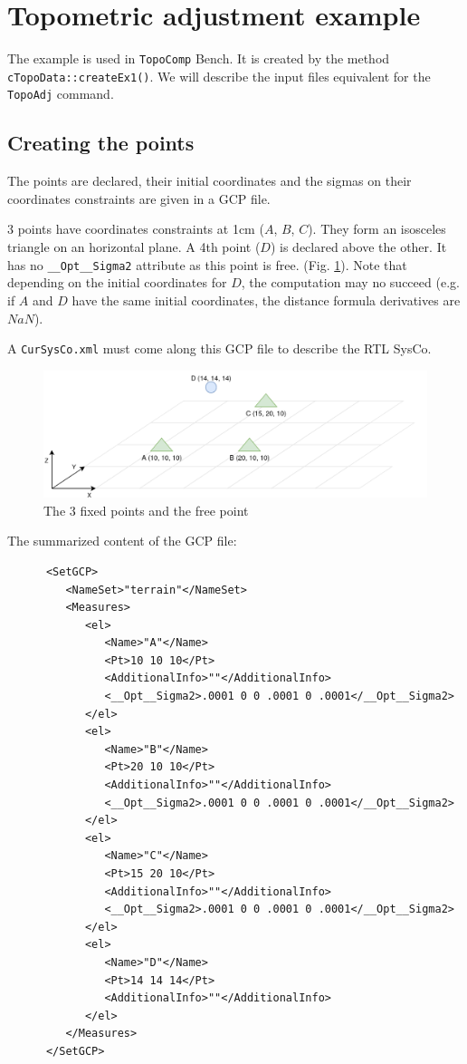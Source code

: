 \section{Topometric adjustment example}
\label{subsec:topoBench}

The example is used in \texttt{TopoComp} Bench. It is created by the method \texttt{cTopoData::createEx1()}.
We will describe the input files equivalent for the \texttt{TopoAdj} command.


\subsection{Creating the points}

The points are declared, their initial coordinates and the sigmas on their coordinates constraints
are given in a GCP file. 

3 points have coordinates constraints at 1cm ($A$, $B$, $C$). They form an isosceles triangle
on an horizontal plane.
A 4th point ($D$) is declared above the other. It has no {\tt \_\_Opt\_\_Sigma2} attribute as this point is free.
(Fig. \ref{fig:topoEx1}). Note that depending on the initial coordinates for $D$, the computation may no succeed
(e.g. if $A$ and $D$ have the same initial coordinates, the distance formula derivatives are $NaN$).

A {\tt CurSysCo.xml} must come along this GCP file to describe the RTL SysCo.


\begin{figure}[!h]
\centering
\includegraphics[width=12cm]{Programmer/benchtopo1b.png}
\caption{The 3 fixed points and the free point}
\label{fig:topoEx1}
\end{figure}

The summarized content of the GCP file:

\begin{lstlisting}
      <SetGCP>
         <NameSet>"terrain"</NameSet>
         <Measures>
            <el>
               <Name>"A"</Name>
               <Pt>10 10 10</Pt>
               <AdditionalInfo>""</AdditionalInfo>
               <__Opt__Sigma2>.0001 0 0 .0001 0 .0001</__Opt__Sigma2>
            </el>
            <el>
               <Name>"B"</Name>
               <Pt>20 10 10</Pt>
               <AdditionalInfo>""</AdditionalInfo>
               <__Opt__Sigma2>.0001 0 0 .0001 0 .0001</__Opt__Sigma2>
            </el>
            <el>
               <Name>"C"</Name>
               <Pt>15 20 10</Pt>
               <AdditionalInfo>""</AdditionalInfo>
               <__Opt__Sigma2>.0001 0 0 .0001 0 .0001</__Opt__Sigma2>
            </el>
            <el>
               <Name>"D"</Name>
               <Pt>14 14 14</Pt>
               <AdditionalInfo>""</AdditionalInfo>
            </el>
         </Measures>
      </SetGCP>
\end{lstlisting}


